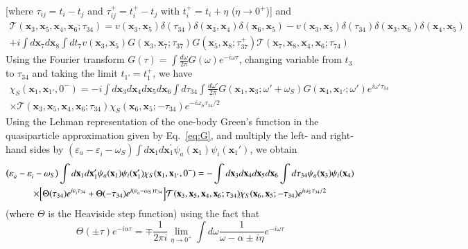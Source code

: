 \documentclass[aip,jcp,reprint,noshowkeys,superscriptaddress]{revtex4-1}
\newcommand{\bx}{\mathbf{x}}
\newcommand{\e}[2]{\eps_{#1}^{#2}}
\newcommand{\SO}[1]{\psi_{#1}}
\newcommand{\eps}{\varepsilon}
\newcommand{\cT}{\mathcal{T}}
\begin{document}
[where $\tau_{ij}=t_i-t_j$ and $\tau^+_{ij}=t^+_i-t_j$ with $t^+_i=t_i+\eta$ ($\eta \to 0^+$)] and
\begin{multline}
\label{eq:T_bar}
	\cT(\bx_3,\bx_5,\bx_4,\bx_6;\tau_{34}) 
	= v(\bx_3,\bx_5)\delta(\tau_{34})\delta(\bx_3,\bx_4)\delta(\bx_6,\bx_5)-v(\bx_3,\bx_5)\delta(\tau_{34})	\delta(\bx_3,\bx_6)\delta(\bx_4,\bx_5)
	\\
	+ i \int d\bx_7 d\bx_8\int dt_ 7 v(\bx_3,\bx_5)G(\bx_3,\bx_7;\tau_{37})G(\bx_5,\bx_8;\tau^+_{37})\cT(\bx_7,\bx_8,\bx_4,\bx_6;\tau_{74})
\end{multline}
Using the Fourier transform $G(\tau)=\int \frac{d\omega}{2\pi}G(\omega)e^{-i\omega\tau}$, changing variable from $t_3$ to $\tau_{34}$ and taking the limit $t_{1'}=t_1^+$, we have
\begin{multline}
	\chi_S(\bx_1,\bx_{1'},0^-)
	= -i\int d\bx_3 d\bx_4 d\bx_5 d\bx_6\int d\tau_{34} \int \frac{d\omega'}{2\pi}G(\bx_1,\bx_3;\omega'+\omega_S)G(\bx_4,\bx_{1'};\omega')e^{i\omega'\tau_{34}}
	\\
	 \times \cT(\bx_3,\bx_5,\bx_4,\bx_6;\tau_{34})\chi_S(\bx_6,\bx_5;-\tau_{34})e^{-i\omega_S\tau_{34}/2}
\end{multline}
Using the Lehman representation of the one-body Green's function in the quasiparticle approximation given by Eq.~\eqref{eq:G}, and multiply the left- and right-hand sides by $(\e{a}{}-\e{i}{}-\omega_S)\int d\bx_1 d\bx^{\prime}_1 \SO{a}(\bx_1)\SO{i}(\bx_1')$, we obtain  
\begin{multline}
\label{eq:General_DYN}
	\qty(\e{a}{}-\e{i}{}-\omega_S)\int d\bx_1d\bx^{\prime}_1 \SO{a}(\bx_1)\SO{i}(\bx_1')  \chi_S(\bx_1,\bx_{1'},0^-) =
	-\int d\bx_3 d\bx_4 d\bx_5 d\bx_6\int d\tau_{34}\SO{a}(\bx_3)\SO{i}(\bx_4)
	\\
	\times \qty[\Theta(\tau_{34})e^{i\e{i}{}\tau_{34}}+\Theta(-\tau_{34})e^{i(\e{a}{}-\omega_S)\tau_{34}} ]
	\cT(\bx_3,\bx_5,\bx_4,\bx_6;\tau_{34})\chi_S(\bx_6,\bx_5;-\tau_{34})e^{i\omega_S\tau_{34}/2}
\end{multline}
(where $\Theta$ is the Heaviside step function) using the fact that
\begin{equation}
	\Theta(\pm\tau)e^{-i\alpha \tau}=\mp\frac{1}{2\pi i}\lim_{\eta\to 0^+}\int d\omega \frac{1}{\omega-\alpha\pm i\eta}e^{-i\omega\tau}
\end{equation}
\end{document}
